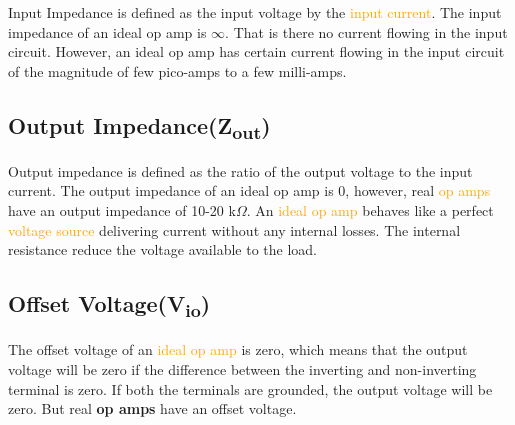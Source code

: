 \documentclass[11pt,a4paper,oneside]{article}
\begin{document}
Input Impedance is defined as the input voltage by the \textcolor{orange}{input current}. The input impedance of an ideal op amp is $\infty$. That is there no current flowing in the input circuit. However, an ideal op amp has certain current flowing in the input circuit of the magnitude of few pico-amps to a few milli-amps.

\subsection{Output Impedance(Z\textsubscript{out})}

Output impedance is defined as the ratio of the output voltage to the input current. The output impedance of an ideal op amp is 0, however, real \textcolor{orange}{op amps} have an output impedance of 10-20 k$\Omega$. An \textcolor{orange}{ideal op amp} behaves like a perfect \textcolor{orange}{voltage source} delivering current without any internal losses. The internal resistance reduce the voltage available to the load.

\subsection{Offset Voltage(V\textsubscript{io})}

The offset voltage of an \textcolor{orange}{ideal op amp} is zero, which means that the output voltage will be zero if the difference between the inverting and non-inverting terminal is zero. If both the terminals are grounded, the output voltage will be zero. But real \textbf{op amps} have an offset voltage.
\end{document}
